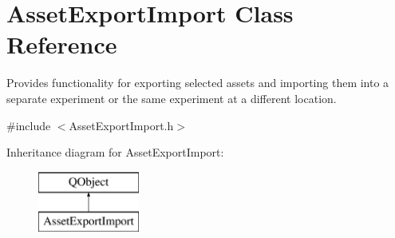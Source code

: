 \hypertarget{class_asset_export_import}{\section{Asset\-Export\-Import Class Reference}
\label{class_asset_export_import}
}


Provides functionality for exporting selected assets and importing them into a separate experiment or the same experiment at a different location.  




{\ttfamily \#include $<$Asset\-Export\-Import.\-h$>$}

Inheritance diagram for Asset\-Export\-Import\-:\begin{figure}[H]
\begin{center}
\leavevmode
\includegraphics[height=2.000000cm]{class_asset_export_import}
\end{center}
\end{figure}
